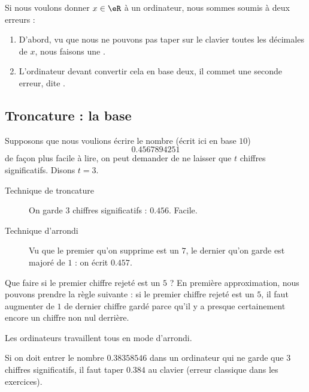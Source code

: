 \begin{remark}
	Si nous voulons donner \( x\in \eR\) à un ordinateur, nous sommes soumis à deux erreurs :
	\begin{enumerate}
		\item
			D'abord, vu que nous ne pouvons pas taper sur le clavier toutes les décimales de \( x\), nous faisons une .
		\item
			L'ordinateur devant convertir cela en base deux, il commet une seconde erreur, dite .
	\end{enumerate}
\end{remark}

\subsection{Troncature : la base}

Supposons que nous voulions écrire le nombre (écrit ici en base \( 10\))
\begin{equation}
	0.4567894251
\end{equation}
de façon plus facile à lire, on peut demander de ne laisser que \( t\) chiffres significatifs. Disons \( t=3\).

\begin{description}
	\item[Technique de troncature] On garde \( 3\) chiffres significatifs : \( 0.456\). Facile.
	\item[Technique d'arrondi] Vu que le premier qu'on supprime est un \( 7\), le dernier qu'on garde est majoré de \( 1\) : on écrit \( 0.457\).
\end{description}

Que faire si le premier chiffre rejeté est un \( 5\) ? En première approximation, nous pouvons prendre la règle suivante : si le premier chiffre rejeté est un \( 5\), il faut augmenter de \( 1\) de dernier chiffre gardé parce qu'il y a presque certainement encore un chiffre non nul derrière.

\begin{remark}
	Les ordinateurs travaillent tous en mode d'arrondi.
\end{remark}

\begin{example}
    Si on doit entrer le nombre \( 0.38358546\) dans un ordinateur qui ne garde que \( 3\) chiffres significatifs, il faut taper \( 0.384\) au clavier (erreur classique dans les exercices).
\end{example}

